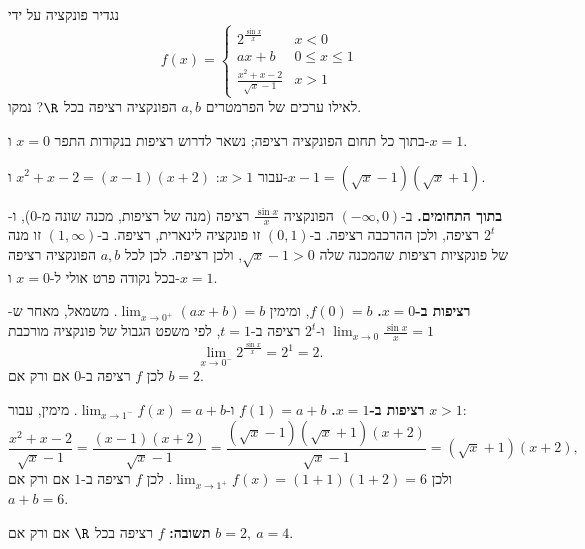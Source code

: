 
\begin{question}
נגדיר פונקציה על ידי
\[ f(x)=\begin{cases}2^{\frac{\sin x}{x}} & x<0\\ ax+b & 0\le x\le 1\\ \frac{x^2+x-2}{\sqrt{x}-1} & x>1\end{cases} \]
לאילו ערכים של הפרמטרים $a,b$ הפונקציה רציפה בכל $\R$? נמקו.
\end{question}

\begin{hint}
בתוך כל תחום הפונקציה רציפה; נשאר לדרוש רציפות בנקודות התפר $x=0$ ו-$x=1$.
\end{hint}

\begin{hint}
עבור $x>1$: $x^2+x-2=(x-1)(x+2)$ ו-$x-1=(\sqrt x-1)(\sqrt x+1)$.
\end{hint}

\begin{solution}
\textbf{בתוך התחומים.} ב-$(-\infty,0)$ הפונקציה $\frac{\sin x}{x}$ רציפה (מנה של רציפות, מכנה שונה מ-$0$), ו-$2^t$ רציפה, ולכן ההרכבה רציפה. ב-$(0,1)$ זו פונקציה לינארית, רציפה. ב-$(1,\infty)$ זו מנה של פונקציות רציפות שהמכנה שלה $\sqrt x-1>0$, ולכן רציפה. לכן לכל $a,b$ הפונקציה רציפה בכל נקודה פרט אולי ל-$x=0$ ו-$x=1$.

\textbf{רציפות ב-$x=0$.} $f(0)=b$, ומימין $\lim_{x\to0^+}(ax+b)=b$. משמאל, מאחר ש-$\lim_{x\to0}\frac{\sin x}{x}=1$ ו-$2^t$ רציפה ב-$t=1$, לפי משפט הגבול של פונקציה מורכבת
\[ \lim_{x\to0^-}2^{\frac{\sin x}{x}}=2^1=2. \]
לכן $f$ רציפה ב-$0$ אם ורק אם $b=2$.

\textbf{רציפות ב-$x=1$.} $f(1)=a+b$ ו-$\lim_{x\to1^-}f(x)=a+b$. מימין, עבור $x>1$:
\[ \frac{x^2+x-2}{\sqrt x-1}=\frac{(x-1)(x+2)}{\sqrt x-1}=\frac{(\sqrt x-1)(\sqrt x+1)(x+2)}{\sqrt x-1}=(\sqrt x+1)(x+2), \]
ולכן $\lim_{x\to1^+}f(x)=(1+1)(1+2)=6$. לכן $f$ רציפה ב-$1$ אם ורק אם $a+b=6$.

\textbf{תשובה:} $f$ רציפה בכל $\R$ אם ורק אם $\boxed{b=2,\ a=4}$.
\end{solution}
